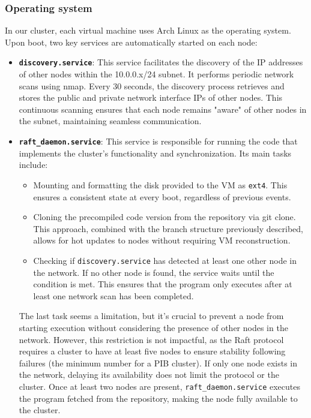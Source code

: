 \subsubsection{Operating system}
In our cluster, each virtual machine uses Arch Linux as the operating system. Upon boot, two key 
services are automatically started on each node:
\begin{itemize}
  \item \textbf{\texttt{discovery.service}}:
    This service facilitates the discovery of the IP addresses of other nodes within the 10.0.0.x/24 
    subnet. It performs periodic network scans using nmap. Every 30 seconds, the discovery process 
    retrieves and stores the public and private network interface IPs of other nodes. This continuous 
    scanning ensures that each node remains "aware" of other nodes in the subnet, maintaining seamless communication.

  \item \textbf{\texttt{raft\_daemon.service}}:
    This service is responsible for running the code that implements the cluster's functionality and 
    synchronization. Its main tasks include:
    \begin{itemize}
      \item Mounting and formatting the disk provided to the VM as \texttt{ext4}. This ensures a consistent
        state at every boot, regardless of previous events.
      \item Cloning the precompiled code version from the repository via git clone. This approach, 
        combined with the branch structure previously described, allows for hot updates to nodes 
        without requiring VM reconstruction.
      \item Checking if \texttt{discovery.service} has detected at least one other node in the network. 
        If no other node is found, the service waits until the condition is met. This ensures 
        that the program only executes after at least one network scan has been completed.
    \end{itemize}
    The last task seems a limitation, but it's crucial to prevent a node from starting execution 
    without considering the presence of other nodes in the network. However, this restriction is 
    not impactful, as the Raft protocol requires a cluster to have at least five nodes to ensure
    stability following failures (the minimum number for a PIB cluster). 
    If only one node exists in the network, delaying its availability does not limit the protocol
    or the cluster. Once at least two nodes are present, \texttt{raft\_daemon.service} executes the program 
    fetched from the repository, making the node fully available to the cluster.
\end{itemize}


